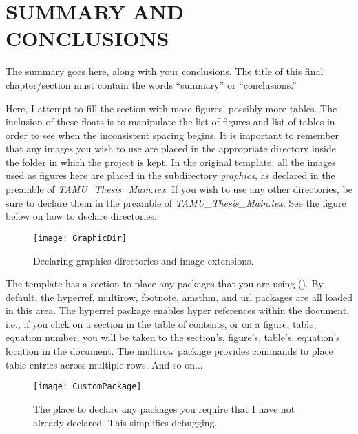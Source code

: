 

\chapter{SUMMARY AND CONCLUSIONS \label{cha:Summary}}

The summary goes here, along with your conclusions. The title of this final chapter/section must contain the words ``summary'' or ``conclusions.''

Here, I attempt to fill the section with more figures, possibly more tables. The inclusion of these floats is to manipulate the list of figures and list of tables in order to see when the inconsistent spacing begins. It is important to remember that any images you wish to use are placed in the appropriate directory inside the folder in which the project is kept. In the original template, all the images used as figures here are placed in the subdirectory \textit{graphics}, as declared in the preamble of \textit{TAMU\_Thesis\_Main.tex}. If you wish to use any other directories, be sure to declare them in the preamble of \textit{TAMU\_Thesis\_Main.tex}. See the figure below on how to declare directories.

\begin{figure}[ht]
	\centering
	\texttt{[image: GraphicDir]}
	\caption{Declaring graphics directories and image extensions.}
\end{figure}

The template has a section to place any packages that you are using (). By default, the hyperref, multirow, footnote, amsthm, and url packages are all loaded in this area. The hyperref package enables hyper references within the document, i.e., if you click on a section in the table of contents, or on a figure, table, equation number, you will be taken to the section's, figure's, table's, equation's location in the document. The multirow package provides commands to place table entries across multiple rows. And so on...

\newpage%

\begin{figure}[t]
	\centering
	\texttt{[image: CustomPackage]}
	\caption{The place to declare any packages you require that I have not already declared. This simplifies debugging.}
	\label{fig:custom_packages}
\end{figure}


